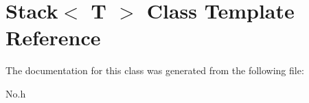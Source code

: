\hypertarget{class_stack}{\section{Stack$<$ T $>$ Class Template Reference}
\label{class_stack}
}


The documentation for this class was generated from the following file\-:\begin{DoxyCompactItemize}
\item 
No.\-h\end{DoxyCompactItemize}
